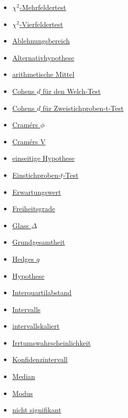 \documentclass[
]{book}
\providecommand{\tightlist}{%
  \setlength{\itemsep}{0pt}\setlength{\parskip}{0pt}}
\theoremstyle{definition}
\theoremstyle{definition}
\theoremstyle{definition}
\theoremstyle{definition}
\theoremstyle{remark}
\begin{document}
\begin{itemize}
\tightlist
\item
  \hyperref[customdef-mehrfeldertest]{\(\chi^2\)-Mehrfeldertest}
\item
  \hyperref[customdef-vierfeldertest]{\(\chi^2\)-Vierfeldertest}
\item
  \hyperref[customdef-ablehnungsbereich]{Ablehnungsbereich}
\item
  \hyperref[customdef-alternativhypothese]{Alternativhypothese}
\item
  \hyperref[customdef-arithmetisches-mittel]{arithmetische Mittel}
\item
  \hyperref[customdef-welch-cohens-d]{Cohens \(d\) für den Welch-Test}
\item
  \hyperref[customdef-cohens-d]{Cohens \(d\) für Zweistichproben-t-Test}
\item
  \hyperref[customdef-cramers-phi]{Cramérs \(\phi\)}
\item
  \hyperref[customdef-cramers-v]{Cramérs V}
\item
  \hyperref[customdef-einseitige-hypothese]{einseitige Hypothese}
\item
  \hyperref[customdef-t-test]{Einstichproben-\(t\)-Test}
\item
  \hyperref[customdef-erwartungswert]{Erwartungswert}
\item
  \hyperref[customdef-freiheitsgrade]{Freiheitsgrade}
\item
  \hyperref[customdef-glass-delta]{Glass \(\Delta\)}
\item
  \hyperref[customdef-grundgesamtheit]{Grundgesamtheit}
\item
  \hyperref[customdef-hedges-g]{Hedges \(g\)}
\item
  \hyperref[customdef-hypothese]{Hypothese}
\item
  \hyperref[customdef-iqr]{Interquartilabstand}
\item
  \hyperref[customdef-interval]{Intervalls}
\item
  \hyperref[customdef-intervallskaliert]{intervallskaliert}
\item
  \hyperref[customdef-erring-level]{Irrtumswahrscheinlichkeit}
\item
  \hyperref[customdef-confidence-interval]{Konfidenzintervall}
\item
  \hyperref[customdef-median]{Median}
\item
  \hyperref[customdef-modus]{Modus}
\item
  \hyperref[customdef-signifikanz]{nicht signifikant}

\end{itemize}
\end{document}
